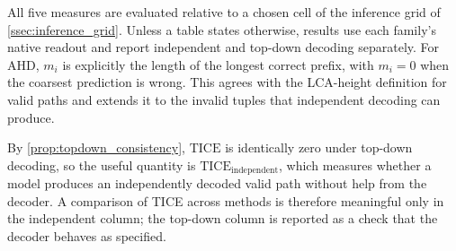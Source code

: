 All five measures are evaluated relative to a chosen cell of the inference grid
of \cref{ssec:inference_grid}. Unless a table states otherwise, results use each
family's native readout and report independent and top-down decoding separately.
For AHD, $m_i$ is explicitly the length of the longest correct prefix, with
$m_i=0$ when the coarsest prediction is wrong. This agrees with the LCA-height
definition for valid paths and extends it to the invalid tuples that independent
decoding can produce.

By \cref{prop:topdown_consistency}, $\mathrm{TICE}$ is identically zero under
top-down decoding, so the useful quantity is
$\mathrm{TICE}_{\text{independent}}$, which measures whether a model produces
an independently decoded valid path without help from the decoder. A comparison of TICE across methods is therefore
meaningful only in the independent column; the top-down column is reported as a
check that the decoder behaves as specified.


%
%
%

